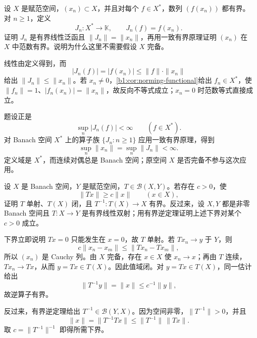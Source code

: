 \begin{exercise}\label{b1:ex:08-uniform-bounded-vectors}
设 \(X\) 是赋范空间，\((x_n)\subset X\)，并且对每个 \(f\in X^*\)，数列 \((f(x_n))\) 都有界。对 \(n\geq1\)，定义
\[
J_n:X^*\longrightarrow\mathbb K,\qquad J_n(f)=f(x_n).
\]
证明 \(J_n\) 是有界线性泛函且 \(\|J_n\|=\|x_n\|\)，再用一致有界原理证明 \((x_n)\) 在 \(X\) 中范数有界。说明为什么这里不需要假设 \(X\) 完备。
\end{exercise}
\begin{solution}
线性由定义得到，而
\[
|J_n(f)|=|f(x_n)|\leq\|f\|\cdot\|x_n\|
\]
给出 \(\|J_n\|\leq\|x_n\|\)。若 \(x_n\ne0\)，\cref{b1:cor:norming-functional}给出 \(f_n\in X^*\)，使 \(\|f_n\|=1\)、\(|f_n(x_n)|=\|x_n\|\)，故反向不等式成立；\(x_n=0\) 时范数等式直接成立。

题设正是
\[
\sup_n|J_n(f)|<\infty\qquad(f\in X^*).
\]
对 Banach 空间 \(X^*\) 上的算子族 \(\{J_n:n\geq1\}\) 应用一致有界原理，得到
\[
\sup_n\|x_n\|=\sup_n\|J_n\|<\infty.
\]
定义域是 \(X^*\)，而连续对偶总是 Banach 空间；原空间 \(X\) 是否完备不参与这次应用。
\end{solution}

\begin{exercise}\label{b1:ex:08-bounded-below-closed-range}
设 \(X\) 是 Banach 空间，\(Y\) 是赋范空间，\(T\in\mathcal B(X,Y)\)。若存在 \(c>0\)，使
\[
\|Tx\|\geq c\|x\|\qquad(x\in X),
\]
证明 \(T\) 单射、\(T(X)\) 闭，且 \(T^{-1}:T(X)\to X\) 有界。反过来，设 \(X,Y\) 都是非零 Banach 空间且 \(T:X\to Y\) 是有界线性双射；用有界逆定理证明上述下界对某个 \(c>0\) 成立。
\end{exercise}
\begin{solution}
下界立即说明 \(Tx=0\) 只能发生在 \(x=0\)，故 \(T\) 单射。若 \(Tx_n\to y\) 于 \(Y\)，则
\[
c\|x_n-x_m\|\leq\|Tx_n-Tx_m\|,
\]
所以 \((x_n)\) 是 Cauchy 列。由 \(X\) 完备，存在 \(x\in X\) 使 \(x_n\to x\)；再由 \(T\) 连续，\(Tx_n\to Tx\)，从而 \(y=Tx\in T(X)\)。因此值域闭。对 \(y=Tx\in T(X)\)，同一估计给出
\[
\|T^{-1}y\|=\|x\|\leq c^{-1}\|y\|,
\]
故逆算子有界。

反过来，有界逆定理给出 \(T^{-1}\in\mathcal B(Y,X)\)。因为空间非零，\(\|T^{-1}\|>0\)，并且
\[
\|x\|=\|T^{-1}Tx\|\leq\|T^{-1}\|\,\|Tx\|.
\]
取 \(c=\|T^{-1}\|^{-1}\) 即得所需下界。
\end{solution}

